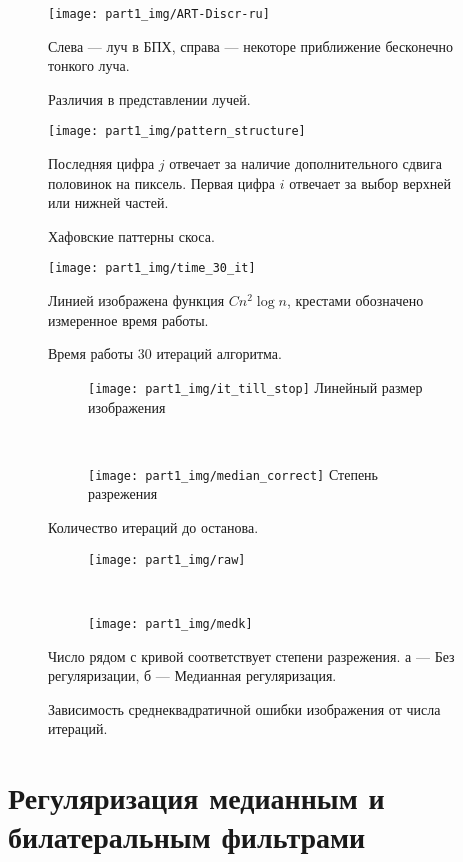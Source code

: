 \begin{figure}[h!]
  \centering
    \texttt{[image: part1\_img/ART-Discr-ru]}
 \caption{Различия в представлении лучей.}
Слева --- луч в БПХ, справа --- некоторе приближение бесконечно тонкого луча.
\label{fig:hough_radon}
\end{figure}

\begin{figure}[h!]
  \centering
    \texttt{[image: part1\_img/pattern\_structure]}
  \caption{Хафовские паттерны скоса.}
\label{fig:patterns}

Последняя цифра $j$ отвечает за наличие  дополнительного сдвига половинок на пиксель. Первая цифра $i$ отвечает за выбор верхней или нижней частей.
\end{figure}

\begin{figure}[h!]
  \centering
    \texttt{[image: part1\_img/time\_30\_it]}
  \caption{Время работы 30 итераций алгоритма.}
Линией изображена функция $Cn^2\log n$, крестами обозначено измеренное время работы.
\label{fig:time_30it}
\end{figure}

\begin{figure}
\begin{subfigure}[h]{0.45\textwidth}
  \centering
    \texttt{[image: part1\_img/it\_till\_stop]}
    Линейный размер изображения
\label{fig:it_till_stop}
\end{subfigure}
~
\begin{subfigure}[h]{0.45\textwidth}
  \centering
    \texttt{[image: part1\_img/median\_correct]}
  Степень разрежения
\label{fig:median_reg}
\end{subfigure}
  \caption{Количество итераций до останова.}
\label{fig:ris5}
\end{figure}

\begin{figure}
\begin{subfigure}[h]{0.45\textwidth}
\centering
  \caption{}
    \texttt{[image: part1\_img/raw]}
\label{fig:conv_raw}
\end{subfigure}
~
\begin{subfigure}[h]{0.45\textwidth}
  \centering
  \caption{}
    \texttt{[image: part1\_img/medk]}
\label{fig:conv_med}
\end{subfigure}
  \caption{Зависимость среднеквадратичной ошибки изображения от числа итераций.}
Число рядом с кривой соответствует степени разрежения. а --- Без регуляризации, б --- Медианная регуляризация.
\label{fig:conv_all}
\end{figure}

\section{Регуляризация медианным и билатеральным фильтрами} \label{sect1_2}

